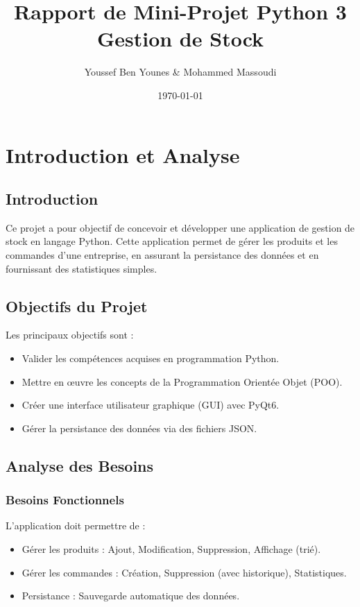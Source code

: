 \documentclass[12pt,a4paper]{report}
\title{\textbf{Rapport de Mini-Projet Python 3}\\Gestion de Stock}
\author{Youssef Ben Younes \& Mohammed Massoudi }
\date{\today}
\begin{document}
\maketitle

\tableofcontents

\chapter{Introduction et Analyse}
\section{Introduction}
Ce projet a pour objectif de concevoir et développer une application de gestion de stock en langage Python. Cette application permet de gérer les produits et les commandes d'une entreprise, en assurant la persistance des données et en fournissant des statistiques simples.

\section{Objectifs du Projet}
Les principaux objectifs sont :
\begin{itemize}
    \item Valider les compétences acquises en programmation Python.
    \item Mettre en œuvre les concepts de la Programmation Orientée Objet (POO).
    \item Créer une interface utilisateur graphique (GUI) avec PyQt6.
    \item Gérer la persistance des données via des fichiers JSON.
\end{itemize}

\section{Analyse des Besoins}
\subsection{Besoins Fonctionnels}
L'application doit permettre de :
\begin{itemize}
    \item Gérer les produits : Ajout, Modification, Suppression, Affichage (trié).
    \item Gérer les commandes : Création, Suppression (avec historique), Statistiques.
    \item Persistance : Sauvegarde automatique des données.
\end{itemize}
\end{document}
